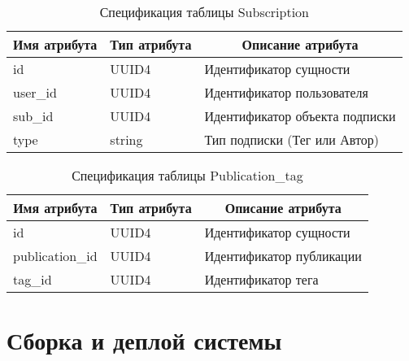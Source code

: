 \begin{table}[H]
	\caption{Спецификация таблицы Subscription}
	\begin{tabular}{|l|l|l|}
		\hline
		\multicolumn{1}{|c|}{\textbf{Имя атрибута}} & \multicolumn{1}{c|}{\textbf{Тип атрибута}} & \multicolumn{1}{c|}{\textbf{Описание атрибута}} \\ \hline
		id                                          & UUID4                                      & Идентификатор сущности                          \\ \hline
		user\_id                                    & UUID4                                      & Идентификатор пользователя                      \\ \hline
		sub\_id                                     & UUID4                                      & Идентификатор объекта подписки                  \\ \hline
		type                                        & string                                     & Тип подписки (Тег или Автор)                    \\ \hline
	\end{tabular}
\end{table}

\begin{table}[H]
	\caption{Спецификация таблицы Publication\_tag}
	\begin{tabular}{|l|l|l|}
		\hline
		\multicolumn{1}{|c|}{\textbf{Имя атрибута}} & \multicolumn{1}{c|}{\textbf{Тип атрибута}} & \multicolumn{1}{c|}{\textbf{Описание атрибута}} \\ \hline
		id                                          & UUID4                                      & Идентификатор сущности                          \\ \hline
		publication\_id                             & UUID4                                      & Идентификатор публикации                        \\ \hline
		tag\_id                                     & UUID4                                      & Идентификатор тега                              \\ \hline
	\end{tabular}
\end{table}

\section{Сборка и деплой системы}


